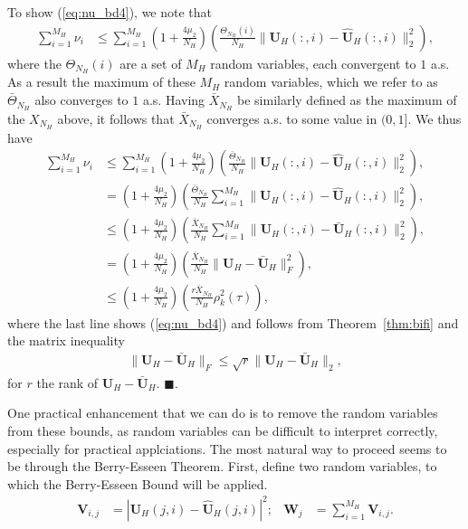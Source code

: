 \documentclass{report}
\begin{document}
To show (\ref{eq:nu_bd4}), we note that
\begin{align}
 \mathop{\sum}\limits_{i=1}^{M_H}\nu_i &\le \mathop{\sum}\limits_{i=1}^{M_H}\left(1+\frac{4\mu_2}{N_H}\right)\left(\frac{\Theta_{N_H}(i)}{N_H}\|\bm{U}_H(:,i)-\hat{\bm{U}}_H(:,i)\|_2^2\right),
\end{align}
where the $\Theta_{N_H}(i)$ are a set of $M_H$ random variables, each convergent to $1$ a.s. As a result the maximum of these $M_H$ random variables, which we refer to as $\bar{\Theta}_{N_H}$ also converges to $1$ a.s. Having $\bar{X}_{N_H}$ be similarly defined as the maximum of the $X_{N_H}$ above, it follows that $\bar{X}_{N_H}$ converges a.s. to some value in $(0,1]$. We thus have 
\begin{align}
 \mathop{\sum}\limits_{i=1}^{M_H}\nu_i &\le \mathop{\sum}\limits_{i=1}^{M_H}\left(1+\frac{4\mu_2}{N_H}\right)\left(\frac{\bar{\Theta}_{N_H}}{N_H}\|\bm{U}_H(:,i)-\hat{\bm{U}}_H(:,i)\|_2^2\right),\\
 &= \left(1+\frac{4\mu_2}{N_H}\right)\left(\frac{\bar{\Theta}_{N_H}}{N_H}\mathop{\sum}\limits_{i=1}^{M_H}\|\bm{U}_H(:,i)-\hat{\bm{U}}_H(:,i)\|_2^2\right)\label{eq:bound_hat},\\
 &\le \left(1+\frac{4\mu_2}{N_H}\right)\left(\frac{\bar{X}_{N_H}}{N_H}\mathop{\sum}\limits_{i=1}^{M_H}\|\bm{U}_H(:,i)-\bar{\bm{U}}_H(:,i)\|_2^2\right)\label{eq:bound_presum},\\
 &= \left(1+\frac{4\mu_2}{N_H}\right)\left(\frac{\bar{X}_{N_H}}{N_H}\|\bm{U}_H-\bar{\bm{U}}_H\|_F^2\right),  \label{eq:bound_incomplete}
\\
 &\le \left(1+\frac{4\mu_2}{N_H}\right)\left(\frac{r\bar{X}_{N_H}}{N_H}\rho^2_k(\tau)\right),
  \label{eq:bound_complete}
\end{align}
where the last line shows (\ref{eq:nu_bd4}) and follows from Theorem~\ref{thm:bifi} and the matrix inequality 
\begin{align}
 \|\bm{U}_H-\bar{\bm{U}}_H\|_F \le \sqrt{r}\|\bm{U}_H-\bar{\bm{U}}_H\|_2,
\end{align}
for $r$ the rank of $\bm{U}_H-\bar{\bm{U}}_H$. 
$\blacksquare$.


One practical enhancement that we can do is to remove the random variables from these bounds, as random variables can be difficult to interpret correctly, especially for practical applciations. The most natural way to proceed seems to be through the Berry-Esseen Theorem. First, define two random variables, to which the Berry-Esseen Bound will be applied.
\begin{align}
\label{eq:V_def}
\bm{V}_{i,j} &= |\bm{U}_H(j,i)-\hat{\bm{U}}_H(j,i)|^2; & \bm{W}_{j} &= \mathop{\sum}\limits_{i=1}^{M_H} \bm{V}_{i,j}.
\end{align}
\end{document}
